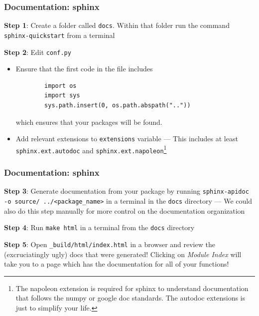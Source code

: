 \documentclass[10pt]{beamer}
\begin{document}
  \begin{frame}[fragile] \frametitle{Documentation: sphinx}

    \textbf{Step 1}: Create a folder called \texttt{docs}. Within that folder run the
    command \texttt{sphinx-quickstart} from a terminal

    \vspace{0.25cm}

    \textbf{Step 2}: Edit \texttt{conf.py}
    \begin{itemize}
      \item Ensure that the first code in the file includes
        \begin{lstlisting}
        import os
        import sys
        sys.path.insert(0, os.path.abspath(".."))
        \end{lstlisting}
        which ensures that your packages will be found.
      \item Add relevant extensions to \texttt{extensions} variable ---
        This includes at least \texttt{sphinx.ext.autodoc} and
        \texttt{sphinx.ext.napoleon}\footnote{The napoleon extension is required for
        sphinx to understand documentation that follows the numpy or google doc
        standards. The autodoc extensions is just to simplify your life.}
    \end{itemize}

  \end{frame}

  \begin{frame} \frametitle{Documentation: sphinx}

     \textbf{Step 3}: Generate documentation from your package by running
     \texttt{sphinx-apidoc -o source/  ../<package\_name>} in a terminal in
     the \texttt{docs} directory --- We could also do this step manually for more control
     on the documentation organization

     \vspace{0.25cm}

     \textbf{Step 4}: Run \texttt{make html} in a terminal from the \texttt{docs}
     directory

     \vspace{0.25cm}

     \textbf{Step 5}: Open \texttt{\_build/html/index.html} in a browser and review the
     (excruciatingly ugly) docs that were generated! Clicking on \textit{Module Index}
     will take you to a page which has the documentation for all of your functions!

  \end{frame}
\end{document}

